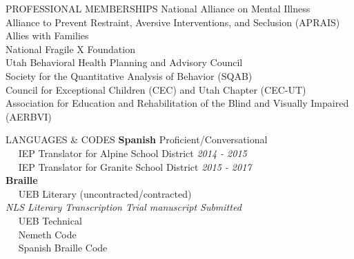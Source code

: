 \documentclass{resume} %
\begin{document}
\begin{rSection}{PROFESSIONAL MEMBERSHIPS}
	{National Alliance on Mental Illness} 
	\\{Alliance to Prevent Restraint, Aversive Interventions, and Seclusion (APRAIS)} 
	\\{Allies with Families} 
	\\{National Fragile X Foundation} 
	\\{Utah Behavioral Health Planning and Advisory Council} 
	\\{Society for the Quantitative Analysis of Behavior (SQAB)} 
	\\{Council for Exceptional Children (CEC) and Utah Chapter (CEC-UT)} 
	\\{Association for Education and Rehabilitation of the Blind and Visually Impaired (AERBVI)} 
\end{rSection}

\begin{rSection}{LANGUAGES \& CODES}
	{\bf Spanish} \hfill {Proficient/Conversational}
	\\ \textbullet~~ IEP Translator for Alpine School District \hfill {\em 2014 - 2015}
	\\ \textbullet~~ IEP Translator for Granite School District \hfill {\em 2015 - 2017}
	\\{\bf Braille} 
	\\ \textbullet~~ UEB Literary (uncontracted/contracted)
    \\ \textit{NLS Literary Transcription Trial manuscript Submitted}
    \\ \textbullet~~ UEB Technical
	\\ \textbullet~~ Nemeth Code 
	\\ \textbullet~~ Spanish Braille Code 
\end{rSection}
\end{document}
